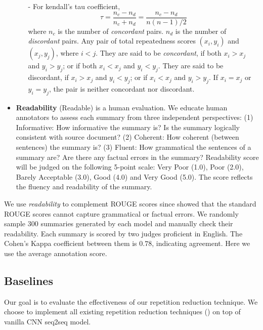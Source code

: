 \begin{itemize}
\begin{itemize}
\item[-] For kendall's tau coefficient,
\begin{equation}
\tau = \frac{n_c - n_d}{n_c + n_d} = \frac{n_c - n_d}{n(n-1)/2}
\end{equation}
where $n_c$ is the number of \textit{concordant} pairs.
$n_d$ is the number of \textit{discordant} pairs.
Any pair of total repeatedness scores $(x_{i},y_{i})$ and $(x_{j},y_{j})$, where $i<j$.
They are said to be \textit{concordant},
if both $x_{i}>x_{j}$ and $y_{i}>y_{j}$; or if both $x_{i}<x_{j}$ and $y_{i}<y_{j}$.
They are said to be discordant, if $x_{i}>x_{j}$ and $y_{i}<y_{j}$; 
or if $x_{i}<x_{j}$ and $y_{i}>y_{j}$. 
If $x_{i}=x_{j}$ or $y_{i}=y_{j}$, the pair is neither concordant nor discordant.
\end{itemize}


\item \textbf{Readability} (Readable) is a human evaluation. 
We educate human annotators to assess each summary
from three independent perspectives: 
(1) Informative: How informative the summary is? 
Is the summary logically consistent with source document? 
(2) Coherent: How coherent (between sentences) the summary is? 
(3) Fluent: How grammatical the sentences of a summary are? 
Are there any factual errors in the summary?
Readability score will be judged on the following 5-point scale:
Very Poor (1.0), Poor (2.0), Barely Acceptable (3.0), Good (4.0) and Very Good (5.0).
The score reflects the fluency and readability of the summary.
\end{itemize}

We use \textit{readability} to complement ROUGE scores 
since \cite{YaoWX17} showed that the standard 
ROUGE scores cannot capture grammatical or factual errors. 
We randomly sample 300 summaries generated by each model
and manually check their readability. 
Each summary is scored by two judges proficient in English. 
The Cohen's Kappa coefficient between them is $0.78$, 
indicating agreement. Here we use the average annotation score.

\subsection{Baselines}
Our goal is to evaluate the
effectiveness of our repetition reduction technique.
We choose to implement 
all existing repetition reduction techniques () 
on top of vanilla CNN seq2seq model.

